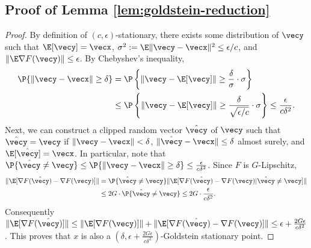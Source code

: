 \subsection{Proof of Lemma \ref{lem:goldstein-reduction}}

\GoldsteinReduction*

\begin{proof}
By definition of $(c,\epsilon)$-stationary, there exists some distribution of $\vecy$ such that $\E[\vecy]=\vecx$, $\sigma^2:=\E\|\vecy-\vecx\|^2 \le \epsilon/c$, and $\|\E \nabla F(\vecy)\| \le \epsilon$. By Chebyshev’s inequality, 
\begin{align*}
    \P\{ \|\vecy-\vecx\| \ge \delta \}
    &= \P\left\{ \|\vecy-\E[\vecy]\| \ge \frac{\delta}{\sigma} \cdot\sigma \right\} \\
    &\le \P\left\{ \|\vecy-\E[\vecy]\| \ge \frac{\delta}{\sqrt{\epsilon/c}} \cdot\sigma \right\} 
    \le \frac{\epsilon}{c\delta^2}.
\end{align*}
Next, we can construct a clipped random vector $\hat \vecy$ of $\vecy$ such that $\hat\vecy = \vecy$ if $\|\vecy-\vecx\|<\delta$, $\|\hat \vecy-\vecx\| \le\delta$ almost surely, and $\E[\hat \vecy]=\vecx$. In particular, note that $\P\{\hat \vecy\ne \vecy\} \le \P\{\|\vecy-\vecx\|\ge \delta\} \le \frac{\epsilon}{c\delta^2}$. Since $F$ is $G$-Lipschitz,
\begin{align*}
    \|\E[\nabla F(\hat\vecy) - \nabla F(\vecy)]\| 
    &= \P\{\hat \vecy \ne \vecy\} \|\E[\nabla F(\hat \vecy)-\nabla F(\vecy) | \hat\vecy\ne \vecy]\| \\
    &\le 2G\cdot \P\{\hat\vecy\ne \vecy\}
    \le 2G \cdot \frac{\epsilon}{c\delta^2}.
\end{align*}
Consequently $\|\E[\nabla F(\hat \vecy)]\| \le \|\E[\nabla F(\vecy)]\| + \|\E[\nabla F(\hat \vecy) - \nabla F(\vecy)]\| \le \epsilon +\frac{2G\epsilon}{c\delta^2}$. This proves that $x$ is also a $(\delta, \epsilon + \frac{2G\epsilon}{c\delta^2})$-Goldstein stationary point. 
\end{proof}
